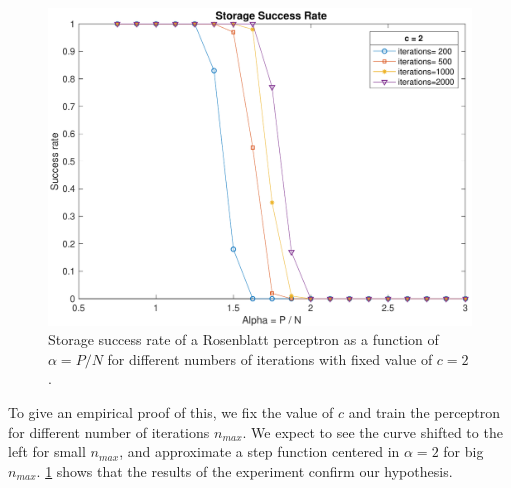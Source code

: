 \begin{figure}[t]
	\centering
	\includegraphics[width=\columnwidth]{figures/bonus_2_epoch}
    \caption{Storage success rate of a Rosenblatt perceptron as a function of $\alpha = P / N$ for different numbers of iterations with fixed value of $c=2$.}
	\label{fig:fixed_c_multiple_epoch}
\end{figure}
To give an empirical proof of this, we fix the value of $c$ and train the perceptron for different number of iterations $n_{max}$.
We expect to see the curve shifted to the left for small $n_{max}$, and approximate a step function centered in $\alpha = 2$ for big $n_{max}$.
\cref{fig:fixed_c_multiple_epoch} shows that the results of the experiment confirm our hypothesis.

